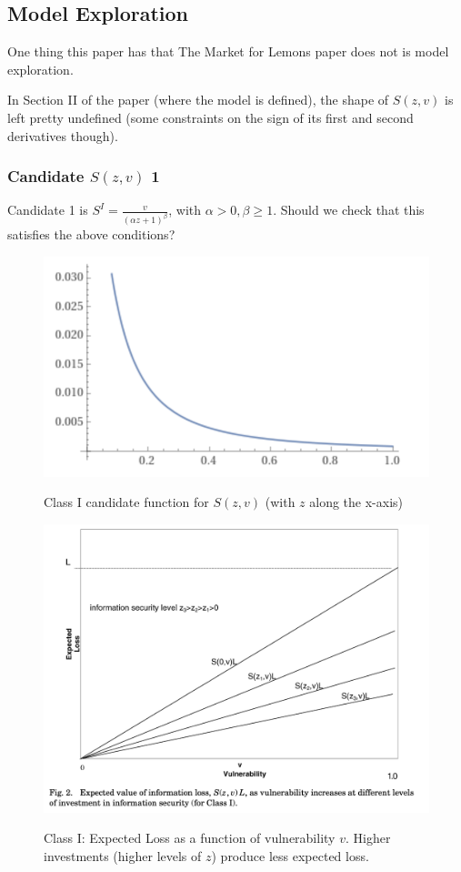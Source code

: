 \documentclass[11pt]{article}
\begin{document}
\subsection{Model Exploration}

One thing this paper has that The Market for Lemons paper does not is model exploration. 

In Section II of the paper (where the model is defined), the shape of $S(z,v)$ is left pretty undefined (some constraints on the sign of its first and second derivatives though).

\subsubsection{Candidate $S(z,v)$ 1}

Candidate 1 is $S^I = \frac{v}{(\alpha z + 1)^\beta}$, with $\alpha > 0, \beta \geq 1$. Should we check that this satisfies the above conditions?

\begin{figure}[h]
    \centering
    \includegraphics*[width=4.5in]{class1.png}
    \label{fig:class1}
    \caption{Class I candidate function for $S(z,v)$ (with $z$ along the x-axis)}
\end{figure}
\FloatBarrier

\begin{figure}[h]
    \centering
    \includegraphics*[width=4.5in]{fig2.png}
    \label{fig:class1}
    \caption{Class I: Expected Loss as a function of vulnerability $v$. Higher investments (higher levels of $z$) produce less expected loss.}
\end{figure}
\FloatBarrier
\end{document}
